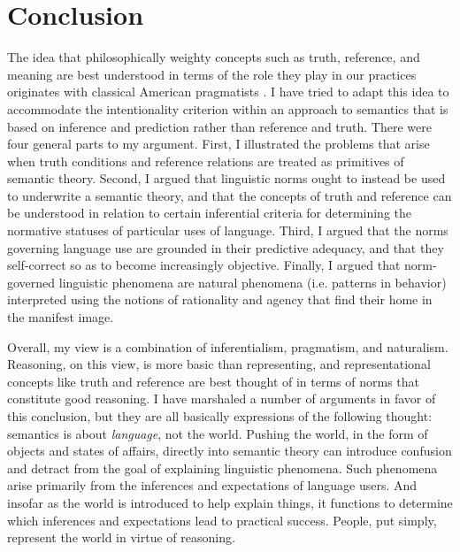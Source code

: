 \section{Conclusion}

The idea that philosophically weighty concepts such as truth, reference, and meaning are best understood in terms of the role they play in our practices originates with classical American pragmatists \citep{Misak:2013,Misak:2007,Peirce:1992,Brandom:2011}. I have tried to adapt this idea to accommodate the intentionality criterion within an approach to semantics that is based on inference and prediction rather than reference and truth. There were four general parts to my argument. First, I illustrated the problems that arise when truth conditions and reference relations are treated as primitives of semantic theory. Second, I argued that linguistic norms ought to instead be used to underwrite a semantic theory, and that the concepts of truth and reference can be understood in relation to certain inferential criteria for determining the normative statuses of particular uses of language. Third, I argued that the norms governing language use are grounded in their predictive adequacy, and that they self-correct so as to become increasingly objective. Finally, I argued that norm-governed linguistic phenomena are natural phenomena (i.e. patterns in behavior) interpreted using the notions of rationality and agency that find their home in the manifest image.

Overall, my view is a combination of inferentialism, pragmatism, and naturalism. Reasoning, on this view, is more basic than representing, and representational concepts like truth and reference are best thought of in terms of norms that constitute good reasoning. I have marshaled a number of arguments in favor of this conclusion, but they are all basically expressions of the following thought: semantics is about \textit{language}, not the world. Pushing the world, in the form of objects and states of affairs, directly into semantic theory can introduce confusion and detract from the goal of explaining linguistic phenomena. Such phenomena arise primarily from the inferences and expectations of language users. And insofar as the world is introduced to help explain things, it functions to determine which inferences and expectations lead to practical success. People, put simply, represent the world in virtue of reasoning.
